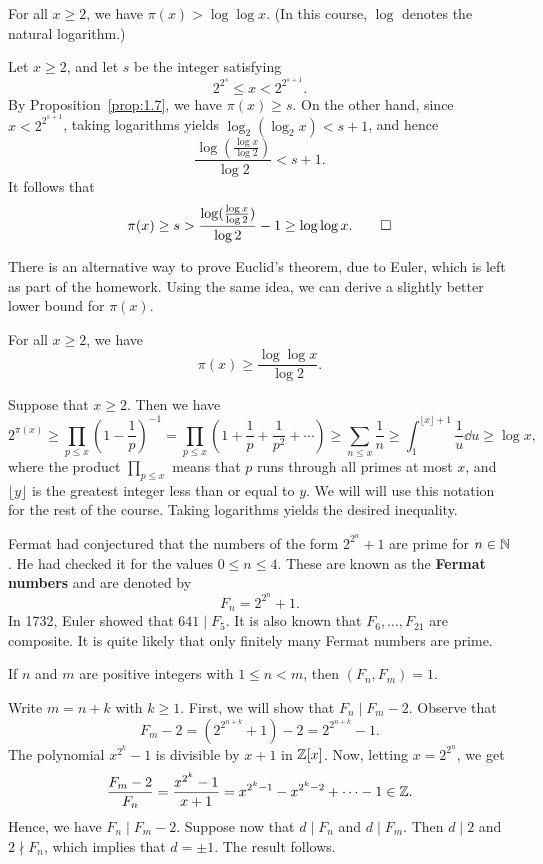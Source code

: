 \begin{cor}\label{cor:1.8}
For all $x \geq 2$, we have $\pi(x) > \log\log x$. (In this course, $\log$ denotes the natural logarithm.)
\end{cor}
\begin{pf}
Let $x \geq 2$, and let $s$ be the integer satisfying 
\[ 2^{2^s} \leq x < 2^{2^{s+1}}. \]
By Proposition~\ref{prop:1.7}, we have $\pi(x) \geq s$. On the other hand, since $x < 2^{2^{s+1}}$, 
taking logarithms yields $\log_2(\log_2 x) < s+1$, and hence 
\[ \frac{\log(\frac{\log x}{\log 2})}{\log 2} < s+1. \]
It follows that 
\[ \pi(x) \geq s > \frac{\log(\frac{\log x}{\log 2})}{\log 2} - 1 \geq \log\log x. \qedhere \]
\end{pf}

There is an alternative way to prove Euclid's theorem, due to Euler, which is left as part of the 
homework. Using the same idea, we can derive a slightly better lower bound for $\pi(x)$. 

\begin{prop}\label{prop:1.9}
For all $x \geq 2$, we have 
\[ \pi(x) \geq \frac{\log\log x}{\log 2}. \]
\end{prop}
\begin{pf}
Suppose that $x \geq 2$. Then we have 
\[ 2^{\pi(x)} \geq \prod_{p\leq x} \left(1 - \frac1p\right)^{-1} = \prod_{p\leq x} \left(1 + \frac1p
+ \frac{1}{p^2} + \cdots \right) \geq \sum_{n\leq x} \frac1n \geq \int_1^{\lfloor x \rfloor + 1}
\frac1u\dd u \geq \log x, \]
where the product $\prod_{p\leq x}$ means that $p$ runs through all primes at most $x$, and
$\lfloor y \rfloor$ is the greatest integer less than or equal to $y$. We will will use this 
notation for the rest of the course. Taking logarithms yields the desired inequality.
\end{pf}

Fermat had conjectured that the numbers of the form $2^{2^n}+1$ are prime for $n \in \mathbb{N}$. 
He had checked it for the values $0 \leq n \leq 4$. These are known as the {\bf Fermat numbers} and 
are denoted by 
\[ F_n = 2^{2^n} + 1. \] 
In 1732, Euler showed that $641 \mid F_5$. It is also known that $F_6, \dots, F_{21}$ are composite. 
It is quite likely that only finitely many Fermat numbers are prime. 

\begin{thm}[Poly\'a]\label{thm:1.10}
If $n$ and $m$ are positive integers with $1 \leq n < m$, then $(F_n, F_m) = 1$. 
\end{thm}
\begin{pf}
Write $m = n+k$ with $k \geq 1$. First, we will show that $F_n \mid F_m - 2$. Observe that 
\[ F_m - 2 = (2^{2^{n+k}} + 1) - 2 = 2^{2^{n+k}} - 1. \]
The polynomial $x^{2^k} - 1$ is divisible by $x+1$ in $\mathbb{Z}[x]$. Now, letting $x = 2^{2^n}$, we get 
\[ \frac{F_m-2}{F_n} = \frac{x^{2^k} - 1}{x+1} = x^{2^k-1} - x^{2^k-2} + \cdots - 1 \in \mathbb{Z}. \] 
Hence, we have $F_n \mid F_m - 2$. Suppose now that $d \mid F_n$ and $d \mid F_m$. Then 
$d \mid 2$ and $2 \nmid F_n$, which implies that $d = \pm1$. The result follows. 
\end{pf}

